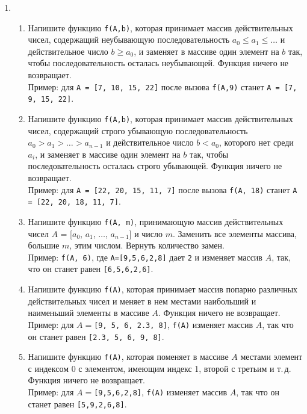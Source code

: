 \documentclass{article}
\begin{document}
\begin{enumerate}[label={}, leftmargin=0pt, itemindent=0pt]
\hrulefill
\item
\begin{enumerate}[label=\arabic{enumi}.\arabic*.]
\item 
Напишите функцию \texttt{f(A,b)}, которая принимает массив действительных чисел, содержащий неубывающую последовательность $a_0 \leqslant a_1 \leqslant \ldots$ и действительное число $b\geqslant a_0$, и заменяет в массиве один элемент на $b$ так, чтобы последовательность осталась неубывающей. Функция ничего не возвращает.
\\Пример: для \texttt{A = [7, 10, 15, 22]} после вызова \texttt{f(A,9)} станет \texttt{A = [7, 9, 15, 22]}.

\item 
Напишите функцию \texttt{f(A,b)}, которая принимает массив действительных чисел, содержащий строго убывающую последовательность $a_0 > a_1 > \ldots > a_{n-1}$ и действительное число $b<a_0$, которого нет среди $a_i$, и заменяет в массиве один элемент на $b$ так, чтобы последовательность осталась строго убывающей. Функция ничего не возвращает.
\\Пример: для \texttt{A = [22, 20, 15, 11, 7]} после вызова \texttt{f(A, 18)} станет \texttt{A = [22, 20, 18, 11, 7]}.

\item 
Напишите функцию \texttt{f(A,\,m)}, принимающую массив действительных чисел $A$ = [$a_0$, $a_1$, $\ldots$, $a_{n-1}$] и число $m$. Заменить все элементы массива, большие $m$, этим числом. Вернуть количество замен.
\\Пример: \texttt{f(A, 6)}, где \texttt{A=[9,5,6,2,8]} дает \texttt{2} и изменяет массив $A$, так, что он станет равен \texttt{[6,5,6,2,6]}.

\item 
Напишите функцию \texttt{f(A)}, которая принимает массив попарно различных действительных чисел и меняет в нем местами наибольший и наименьший элементы в массиве $A$. Функция ничего не возвращает.
\\Пример: для $A=$\texttt{[9, 5, 6, 2.3, 8]}, \texttt{f(A)} изменяет массив $A$, так что он станет равен \texttt{[2.3, 5, 6, 9, 8]}.

\item 
Напишите функцию \texttt{f(A)}, которая поменяет в массиве $A$ местами элемент с индексом 0 с элементом, имеющим индекс 1, второй с третьим и т.\,д. Функция ничего не возвращает.
\\Пример: для $A=$\texttt{[9,5,6,2,8]}, \texttt{f(A)} изменяет массив $A$, так что он станет равен \texttt{[5,9,2,6,8]}.


\end{enumerate}
\end{enumerate}
\end{document}
